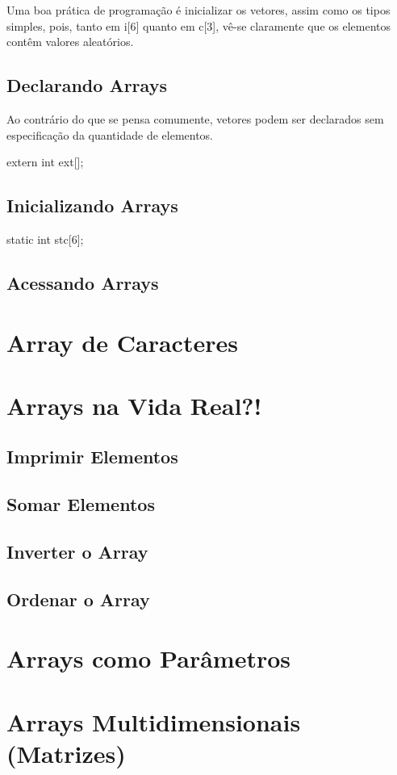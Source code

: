 Uma boa prática de programação é inicializar os vetores, assim como os tipos simples, pois, tanto em i[6] quanto em c[3], vê-se claramente que os elementos contêm valores aleatórios.

\subsection{Declarando Arrays}

Ao contrário do que se pensa comumente, vetores podem ser declarados sem especificação da quantidade de elementos.

\begin{ccode}
  extern int ext[];
\end{ccode}

\subsection{Inicializando Arrays}

\begin{ccode}
  static int stc[6];
\end{ccode}

\subsection{Acessando Arrays}

\section{Array de Caracteres}

\section{Arrays na Vida Real?!}
\subsection{Imprimir Elementos}
\subsection{Somar Elementos}
\subsection{Inverter o Array}
\subsection{Ordenar o Array}

\section{Arrays como Parâmetros}

\section{Arrays Multidimensionais (Matrizes)}


